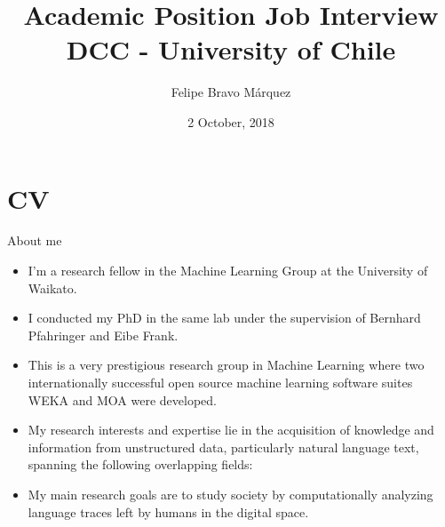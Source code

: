 \documentclass[handout]{beamer}
\title{Academic Position Job Interview\\ DCC - University of Chile}
\author[Felipe Bravo Márquez]{Felipe Bravo Márquez}
\date{2 October, 2018}
\begin{document}
\begin{frame}
\titlepage


\end{frame}




\section{CV}


\begin{frame}{About me}
\begin{scriptsize}
\begin{itemize}
 \item I'm a research fellow in the Machine Learning Group at the University of Waikato. 
 \item I conducted my PhD in the same lab under the supervision of Bernhard Pfahringer and Eibe Frank.
 \item This is a very prestigious research group in Machine Learning where two internationally successful open source machine learning software suites WEKA and MOA were developed. 
 \item My research interests and expertise lie in the acquisition of knowledge and information from unstructured data, particularly natural language text, spanning the following overlapping fields:
\begin{enumerate}
\end{enumerate}

\item My main research goals are to study society by computationally analyzing language traces left by humans in the digital space.


\end{itemize}


\end{scriptsize}

\end{frame}
\end{document}
